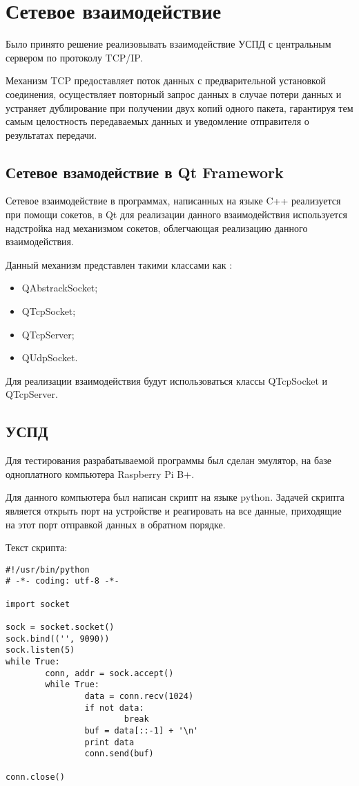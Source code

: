 \section{Сетевое взаимодействие}

Было принято решение реализовывать взаимодействие УСПД с центральным сервером по протоколу TCP/IP.

Механизм TCP предоставляет поток данных с предварительной установкой соединения, осуществляет повторный запрос данных в случае потери данных и устраняет дублирование при получении двух копий одного пакета, гарантируя тем самым целостность передаваемых данных и уведомление отправителя о результатах передачи.

\subsection{Сетевое взамодействие в Qt Framework}

Сетевое взаимодействие в программах, написанных на языке C++ реализуется при помощи сокетов, в Qt для реализации данного взаимодействия используется надстройка над механизмом сокетов, облегчающая реализацию данного взаимодействия.

Данный механизм представлен такими классами как \cite{qt_net}:
\begin{itemize}
 \item QAbstrackSocket;
 \item QTcpSocket;
 \item QTcpServer;
 \item QUdpSocket.
\end{itemize}

Для реализации взаимодействия будут использоваться классы QTcpSocket и QTcpServer.

\subsection{УСПД}

Для тестирования разрабатываемой программы был сделан эмулятор, на базе одноплатного компьютера Raspberry Pi B+. 

Для данного компьютера был написан скрипт на языке python. Задачей скрипта является открыть порт на устройстве и реагировать на все данные, приходящие на этот порт отправкой данных в обратном порядке. 

Текст скрипта:

\begin{lstlisting}
#!/usr/bin/python
# -*- coding: utf-8 -*-

import socket

sock = socket.socket()
sock.bind(('', 9090))
sock.listen(5)
while True:
        conn, addr = sock.accept()
        while True:
                data = conn.recv(1024)
                if not data:
                        break
                buf = data[::-1] + '\n'
                print data
                conn.send(buf)

conn.close()
\end{lstlisting}

